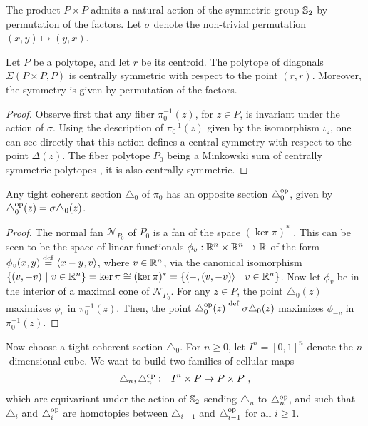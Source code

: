 The product $P \times P$ admits a natural action of the symmetric group $\mathbb{S}_2$ by permutation of the factors. Let $\sigma$ denote the non-trivial permutation $(x,y)\mapsto (y,x)$.

\begin{proposition}
	Let $P$ be a polytope, and let $r$ be its centroid. The polytope of diagonals $\Sigma (P \times P, P)$ is centrally symmetric with respect to the point $(r,r)$. Moreover, the symmetry is given by permutation of the factors. 
\end{proposition}
\begin{proof} 
    Observe first that any fiber $\pi_0^{-1}(z)$, for $z \in P$, is invariant under the action of $\sigma$.  
    Using the description of $\pi_0^{-1}(z)$ given by the isomorphism $\iota_z$, one can see directly that this action defines a central symmetry with respect to the point $\Delta (z)$.
    The fiber polytope $P_0$ being a Minkowski sum of centrally symmetric polytopes \cite[Theorem 1.5]{BilleraSturmfels92}, it is also centrally symmetric.
\end{proof}

\begin{corollary}
	Any tight coherent section $\triangle_0$ of $\pi_0$ has an opposite section $\triangle_0^{\mathrm{op}}$, given by $\triangle_0^{\mathrm{op}}(z)=\sigma\triangle_0(z)$.
\end{corollary}

\begin{proof}
	The normal fan $\mathcal{N}_{P_0}$ of $P_0$ is a fan of the space $(\ker \pi)^{*}$ \cite[Section 2]{BilleraSturmfels94}. 
    This can be seen to be the space of linear functionals $\phi_v : \mathbb{R}^n \times \mathbb{R}^n \to \mathbb{R}$ of the form $\phi_v(x,y) \stackrel{\mathrm{def}}{=} \langle x-y, v \rangle$, where $v \in \mathbb{R}^n$, via the canonical isomorphism $\{(v,-v) \ | \ v \in \R^n \}=\ker \pi \cong (\ker \pi)^{*}=\{\langle -, (v,-v)\rangle \ | \ v \in \R^n \}$. 
    Now let $\phi_v$ be in the interior of a maximal cone of $\mathcal{N}_{P_0}$.
	For any $z\in P$, the point $\triangle_0(z)$ maximizes $\phi_v$ in $\pi_0^{-1}(z)$.
	Then, the point $\triangle_0^{\mathrm{op}}(z) \stackrel{\mathrm{def}}{=} \sigma \triangle_0(z)$ maximizes $\phi_{-v}$ in $\pi_0^{-1}(z)$.
\end{proof}

Now choose a tight coherent section $\triangle_0$.
For $n\geq 0$, let $I^n=[0,1]^n$ denote the $n$-dimensional cube.
We want to build two families of cellular maps
\begin{eqnarray*}
\triangle_n, \triangle^{\mathrm{op}}_n & : & I^n \times P \to P \times P  \ ,
\end{eqnarray*}
which are equivariant under the action of $\mathbb{S}_2$ sending $\triangle_n$ to $\triangle^{\mathrm{op}}_n$, and such that $\triangle_i$ and $\triangle_i^{\mathrm{op}}$ are homotopies between $\triangle_{i-1}$ and $\triangle_{i-1}^{\mathrm{op}}$ for all $i \geq 1$.

